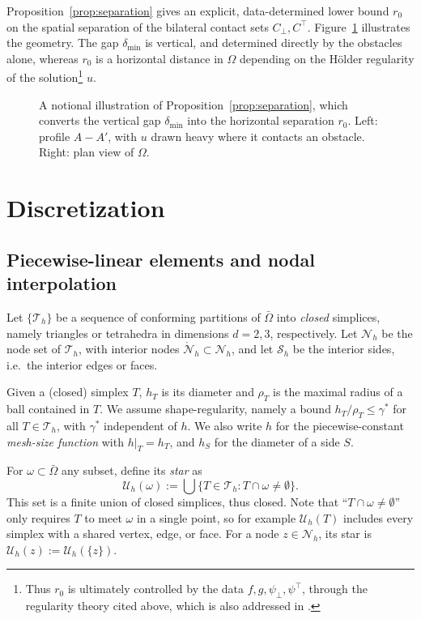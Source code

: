 \documentclass[12pt]{amsart}
\numberwithin{equation}{section}
\theoremstyle{plain}
\theoremstyle{definition}
\theoremstyle{remark}
\newcommand{\Om}{\Omega}
\newcommand{\psilo}{\psi_\bot}
\newcommand{\psiup}{\psi^\top}
\newcommand{\Cbot}{C_\bot}
\newcommand{\Ctop}{C^\top}
\newcommand{\Th}{\mathcal{T}_h}
\newcommand{\Nh}{\mathcal{N}_h}
\newcommand{\Nhr}{\mathring{\mathcal{N}}_h}
\newcommand{\Sh}{\mathcal{S}_h}
\newcommand{\Uh}{\mathcal{U}_h}
\begin{document}
Proposition~\ref{prop:separation} gives an explicit, data-determined lower bound $r_0$ on the spatial separation of the bilateral contact sets $\Cbot, \Ctop$.  Figure~\ref{fig:separation} illustrates the geometry.  The gap $\delta_{\min}$ is vertical, and determined directly by the obstacles alone, whereas $r_0$ is a horizontal distance in $\Om$ depending on the H\"older regularity of the solution\footnote{Thus $r_0$ is ultimately controlled by the data $f,g,\psilo,\psiup$, through the regularity theory cited above, which is also addressed in \cite{KinderlehrerStampacchia1980}.} $u$. 

\begin{figure}[ht]
\centering

\caption{A notional illustration of Proposition~\ref{prop:separation}, which converts the vertical gap $\delta_{\min}$ into the horizontal separation $r_0$.  Left: profile $A-A'$, with $u$ drawn heavy where it contacts an obstacle.  Right: plan view of $\Om$.}
\label{fig:separation}
\end{figure}


\section{Discretization} \label{sec:discretization}

\subsection{Piecewise-linear elements and nodal interpolation}  Let $\{\Th\}$ be a sequence of conforming partitions of $\bar\Om$ into \emph{closed} simplices, namely triangles or tetrahedra in dimensions $d=2,3$, respectively.  Let $\Nh$ be the node set of $\Th$, with interior nodes $\Nhr \subset \Nh$, and let $\Sh$ be the interior sides, i.e.~the interior edges or faces.

Given a (closed) simplex $T$, $h_T$ is its diameter and $\rho_T$ is the maximal radius of a ball contained in $T$.  We assume shape-regularity, namely a bound $h_T/\rho_T \le \gamma^*$ for all $T \in \Th$, with $\gamma^*$ independent of $h$.  We also write $h$ for the piecewise-constant \emph{mesh-size function} with $h|_T = h_T$, and $h_S$ for the diameter of a side $S$.

For $\omega \subset \bar\Om$ any subset, define its \emph{star} as
\begin{equation}
\label{eq:star}
\Uh(\omega) := \bigcup\{T \in \Th : T \cap \omega \ne \emptyset\}.
\end{equation}
This set is a finite union of closed simplices, thus closed.  Note that ``$T \cap \omega \ne \emptyset$'' only requires $T$ to meet $\omega$ in a single point, so for example $\Uh(T)$ includes every simplex with a shared vertex, edge, or face.  For a node $z \in \Nh$, its star \cite{Langeetal2016} is $\Uh(z) := \Uh(\{z\})$.
\end{document}
